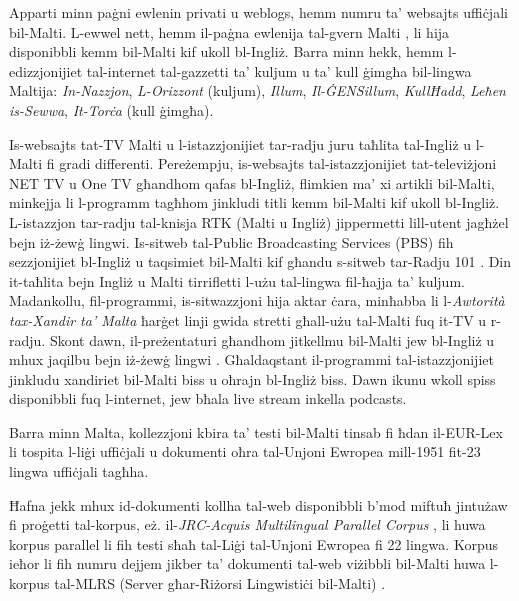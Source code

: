 \documentclass[]{../../metanetpaper}
\begin{document}
\begin{multicols}{2}
Apparti minn paġni ewlenin privati u weblogs, hemm numru ta’ websajts uffiċjali bil-Malti. L-ewwel nett, hemm il-paġna ewlenija tal-gvern Malti \cite{GovernmentOfMalta1}, li hija disponibbli kemm bil-Malti kif ukoll bl-Ingliż. Barra minn hekk, hemm l-edizzjonijiet tal-internet tal-gazzetti ta’ kuljum u ta’ kull ġimgħa bil-lingwa Maltija: \emph{In-Nazzjon}, \emph{L-Orizzont} (kuljum), \emph{Illum}, \emph{Il-ĠENSillum}, \emph{KullĦadd}, \emph{Leħen is-Sewwa}, \emph{It-Torċa} (kull ġimgħa).

Is-websajts tat-TV Malti u l-istazzjonijiet tar-radju juru taħlita tal-Ingliż u l-Malti fi gradi differenti. Pereżempju, is-websajts tal-istazzjonijiet tat-televiżjoni NET TV \cite{NetTV1} u One TV \cite{OneTV1} għandhom qafas bl-Ingliż, flimkien ma’ xi artikli bil-Malti, minkejja li l-programm tagħhom jinkludi titli kemm bil-Malti kif ukoll bl-Ingliż. L-istazzjon tar-radju tal-knisja RTK \cite{RTK1} (Malti u Ingliż) jippermetti lill-utent jagħżel bejn iż-żewġ lingwi. Is-sitweb tal-Public Broadcasting Services (PBS) \cite{PBS1} fih sezzjonijiet bl-Ingliż u taqsimiet bil-Malti kif għandu s-sitweb tar-Radju 101 \cite{radio101}. Din it-taħlita bejn Ingliż u Malti tirrifletti l-użu tal-lingwa fil-ħajja ta’ kuljum. Madankollu, fil-programmi, is-sitwazzjoni hija aktar ċara, minħabba li l-\emph{Awtorità tax-Xandir ta’ Malta} ħarġet linji gwida stretti għall-użu tal-Malti fuq it-TV u r-radju. Skont dawn, il-preżentaturi għandhom jitkellmu bil-Malti jew bl-Ingliż u mhux jaqilbu bejn iż-żewġ lingwi \cite{Fabri:2011a}. Għaldaqstant il-programmi tal-istazzjonijiet jinkludu xandiriet bil-Malti biss u oħrajn bl-Ingliż biss. Dawn ikunu wkoll spiss disponibbli fuq l-internet, jew bħala live stream inkella podcasts.

Barra minn Malta, kollezzjoni kbira ta’ testi bil-Malti tinsab fi ħdan il-EUR-Lex \cite{EURLex1} li tospita l-liġi uffiċjali u dokumenti oħra tal-Unjoni Ewropea mill-1951 fit-23 lingwa uffiċjali tagħha.

Ħafna jekk mhux id-dokumenti kollha tal-web disponibbli b’mod miftuħ jintużaw fi proġetti tal-korpus, eż. il-\emph{JRC-Acquis Multilingual Parallel Corpus} \cite{JRC-Acquis1}, li huwa korpus parallel li fih testi sħaħ tal-Liġi tal-Unjoni Ewropea fi 22 lingwa. Korpus ieħor li fih numru dejjem jikber ta’ dokumenti tal-web viżibbli bil-Malti huwa l-korpus tal-MLRS (Server għar-Riżorsi Lingwistiċi bil-Malti) \cite{MLRS1}.
\end{multicols}

\clearpage
\end{document}

